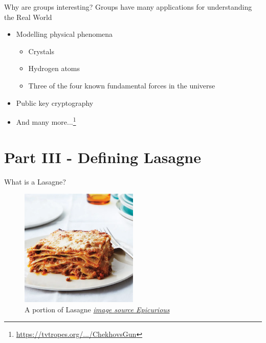 \documentclass{beamer}
\begin{document}
\begin{frame}{Why are groups interesting?}
    Groups have many applications for understanding the Real World\texttrademark
    \begin{itemize}
        \item Modelling physical phenomena
        \begin{itemize}
            \item Crystals
            \item Hydrogen atoms
            \item Three of the four known fundamental forces in the universe
        \end{itemize}
        \item Public key cryptography
        \item And many more...\footnote{\href{https://tvtropes.org/pmwiki/pmwiki.php/Main/ChekhovsGun}{https://tvtropes.org/.../ChekhovsGun}}
    \end{itemize}
\end{frame}


\section{Part III - Defining Lasagne}


\begin{frame}{What is a Lasagne?}
    \begin{figure}
        \includegraphics[width=0.5\textwidth]{lasagne_unstacked.png}
        \caption{\label{fig:lasagane-unstacked}A portion of Lasagne \textit{\href{https://www.epicurious.com/recipes/food/views/lasagne-bolognese-51193620}{image source Epicurious}}}
    \end{figure}
\end{frame}
\end{document}
